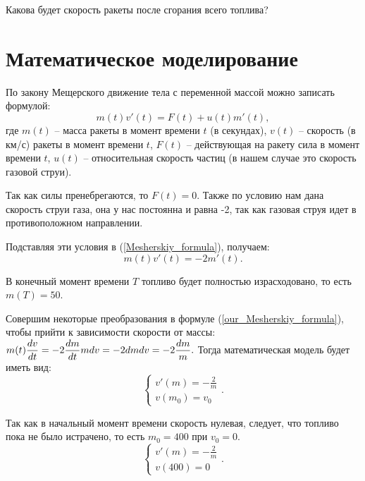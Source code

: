 \documentclass[a4paper,14pt]{extarticle}
\begin{document}
    Какова будет скорость ракеты после сгорания всего топлива?

    \section{Математическое моделирование}
    По закону Мещерского движение тела с переменной массой можно записать формулой:
    \begin{equation} \label{Mesherskiy_formula}
        m(t) v'(t) = F(t) + u(t) m'(t),
    \end{equation}
    где $m(t)$ -- масса ракеты в момент времени $t$ (в секундах), $v(t)$ -- скорость (в км/с) ракеты в момент времени $t$, $F(t)$ -- действующая на ракету сила в момент времени $t$, $u(t)$ -- относительная скорость частиц (в нашем случае это скорость газовой струи).
    
    Так как силы пренебрегаются, то $F(t) = 0$.
    Также по условию нам дана скорость струи газа, она у нас постоянна и равна -2, так как газовая струя идет в противоположном направлении.
    
    Подставляя эти условия в (\ref{Mesherskiy_formula}), получаем:
    \begin{equation} \label{our_Mesherskiy_formula}
        m(t) v'(t) = -2 m'(t).
    \end{equation}

    В конечный момент времени $T$ топливо будет полностью израсходовано, то есть $m(T) = 50$.
    

    Совершим некоторые преобразования в формуле (\ref{our_Mesherskiy_formula}), чтобы прийти к зависимости скорости от массы: \\
    $\displaystyle
    m(t) \frac{dv}{dt} = -2 \frac{dm}{dt} \\
    m dv = -2 dm \\
    dv = -2 \frac{dm}{m}. \\
    $
    Тогда математическая модель будет иметь вид:
    \begin{equation*}
        \begin{cases}
            \displaystyle v'(m) = -\frac{2}{m} \\
            v(m_0) = v_0
        \end{cases}.
    \end{equation*}

    Так как в начальный момент времени скорость нулевая, следует, что топливо пока не было истрачено, то есть $m_0 = 400$ при $v_0 = 0$.
    \begin{equation} \label{model}
        \begin{cases}
            \displaystyle v'(m) = -\frac{2}{m} \\
            v(400) = 0
        \end{cases}.
    \end{equation}
\end{document}
